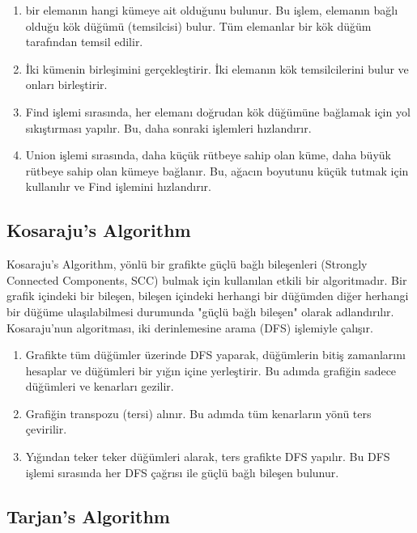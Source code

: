 \begin{enumerate}
    \item bir elemanın hangi kümeye ait olduğunu bulunur. Bu işlem, elemanın bağlı olduğu kök düğümü (temsilcisi) bulur. Tüm elemanlar bir kök düğüm tarafından temsil edilir.
    \item İki kümenin birleşimini gerçekleştirir. İki elemanın kök temsilcilerini bulur ve onları birleştirir.
    \item Find işlemi sırasında, her elemanı doğrudan kök düğümüne bağlamak için yol sıkıştırması yapılır. Bu, daha sonraki işlemleri hızlandırır.
    \item Union işlemi sırasında, daha küçük rütbeye sahip olan küme, daha büyük rütbeye sahip olan kümeye bağlanır. Bu, ağacın boyutunu küçük tutmak için kullanılır ve Find işlemini hızlandırır.
\end{enumerate}

\newpage

\subsection{Kosaraju's Algorithm}

Kosaraju's Algorithm, yönlü bir grafikte güçlü bağlı bileşenleri (Strongly Connected Components, SCC) bulmak için kullanılan etkili bir algoritmadır. Bir grafik içindeki bir bileşen, bileşen içindeki herhangi bir düğümden diğer herhangi bir düğüme ulaşılabilmesi durumunda "güçlü bağlı bileşen" olarak adlandırılır. Kosaraju'nun algoritması, iki derinlemesine arama (DFS) işlemiyle çalışır. 

\begin{enumerate}
    \item Grafikte tüm düğümler üzerinde DFS yaparak, düğümlerin bitiş zamanlarını hesaplar ve düğümleri bir yığın içine yerleştirir. Bu adımda grafiğin sadece düğümleri ve kenarları gezilir.
    \item Grafiğin transpozu (tersi) alınır. Bu adımda tüm kenarların yönü ters çevirilir.
    \item Yığından teker teker düğümleri alarak, ters grafikte DFS yapılır. Bu DFS işlemi sırasında her DFS çağrısı ile güçlü bağlı bileşen bulunur.
\end{enumerate}

\newpage

\subsection{Tarjan's Algorithm}

